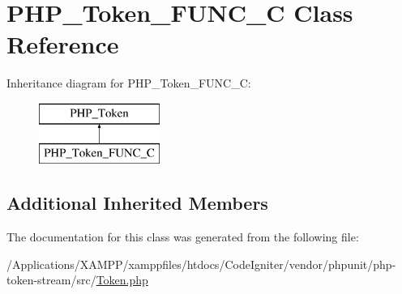 \hypertarget{class_p_h_p___token___f_u_n_c___c}{}\section{P\+H\+P\+\_\+\+Token\+\_\+\+F\+U\+N\+C\+\_\+C Class Reference}
\label{class_p_h_p___token___f_u_n_c___c}
Inheritance diagram for P\+H\+P\+\_\+\+Token\+\_\+\+F\+U\+N\+C\+\_\+C\+:\begin{figure}[H]
\begin{center}
\leavevmode
\includegraphics[height=2.000000cm]{class_p_h_p___token___f_u_n_c___c}
\end{center}
\end{figure}
\subsection*{Additional Inherited Members}


The documentation for this class was generated from the following file\+:\begin{DoxyCompactItemize}
\item 
/\+Applications/\+X\+A\+M\+P\+P/xamppfiles/htdocs/\+Code\+Igniter/vendor/phpunit/php-\/token-\/stream/src/\mbox{\hyperlink{_token_8php}{Token.\+php}}\end{DoxyCompactItemize}
